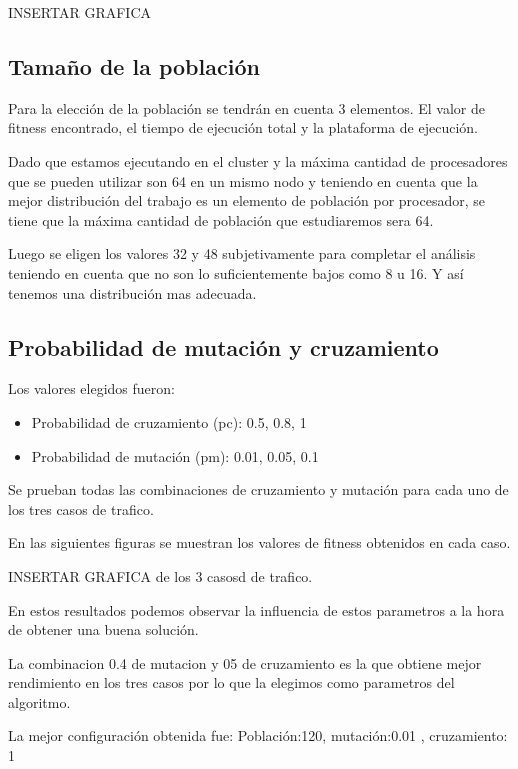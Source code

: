 INSERTAR GRAFICA


\subsection{Tamaño de la población}

Para la elección de la población se tendrán en cuenta 3 elementos. El valor de fitness encontrado, el tiempo de ejecución total y la plataforma de ejecución.

Dado que estamos ejecutando en el cluster y la máxima cantidad de procesadores que se pueden utilizar son 64 en un mismo nodo y teniendo en cuenta que la mejor distribución del trabajo es un elemento de población por procesador, se tiene que la máxima cantidad de población que estudiaremos sera 64.

Luego se eligen los valores 32 y 48 subjetivamente para completar el análisis teniendo en cuenta que no son lo suficientemente bajos como 8 u 16. Y así tenemos una distribución mas adecuada.





\subsection{Probabilidad de mutación y cruzamiento}

Los valores elegidos fueron:

\begin{itemize}
	\item Probabilidad de cruzamiento (pc):  0.5, 0.8, 1
	\item Probabilidad de  mutación (pm):  0.01, 0.05, 0.1
\end{itemize}

Se prueban todas las combinaciones  de cruzamiento y mutación para cada uno de los tres casos de trafico.

En las siguientes figuras se muestran los valores de fitness obtenidos en cada caso.


INSERTAR GRAFICA de los 3 casosd de trafico.

En estos resultados podemos observar la influencia de estos parametros a la hora de obtener una buena solución.

La combinacion 0.4 de mutacion y 05 de cruzamiento es la que obtiene mejor rendimiento en los tres casos por lo que la elegimos como parametros del algoritmo.

La mejor  configuración obtenida fue:
Población:120, mutación:0.01 , cruzamiento: 1

